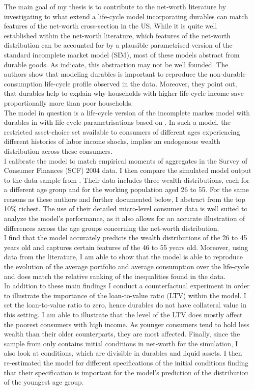 \documentclass[a4paper,12pt,legno]{article}
\begin{document}
The main goal of my thesis is to contribute to the net-worth literature by investigating to what extend a life-cycle model incorporating durables can match features of the net-worth cross-section in the US. While it is quite well established within the net-worth literature, which features of the net-worth distribution can be accounted for by a plausible parametrised version of the standard incomplete market model (SIM), most of these models abstract from durable goods. As \cite{FV&K2011}  indicate, this abstraction may not be well founded. The authors show that modeling durables is important to reproduce the non-durable consumption life-cycle profile observed in the data. Moreover, they point out, that durables help to explain why households with higher life-cycle income save proportionally more than poor households.\\
The model in question is a life-cycle version of the incomplete markes model with durables in \cite{hintermaier2010} with life-cycle parametrisations based on \cite{hintermaier2011}. In such a model, the restricted asset-choice set available to consumers of different ages experiencing different histories of labor income shocks, implies an endogenous wealth distribution across these consumers. \\
I calibrate the model to match empirical moments of aggregates in the Survey of Consumer Finances (SCF) 2004 data. I then compare the simulated model output to the data sample from \cite{hintermaier2011}. Their data includes three wealth distributions, each for a different age group and for the working population aged 26 to 55. For the same reasons as these authors and further documented below, I abstract from the top 10\% richest. The use of their detailed micro-level consumer data is well suited to analyze the model's performance, as it also allows for an accurate illustration of differences across the age groups concerning the net-worth distribution.\\
I find that the model accurately predicts the wealth distributions of the 26 to 45 years old and captures certain features of the 46 to 55 years old. Moreover, using data from the literature, I am able to show that the model is able to reproduce the evolution of the average portfolio and average consumption over the life-cycle and does match the relative ranking of the inequalities found in the data. 
\\ 
In addition to these main findings I conduct a counterfactual experiment in order to illustrate the importance of the loan-to-value ratio (LTV) within the model. I set the loan-to-value ratio to zero, hence durables do not have collateral value in this setting. I am able to illustrate that the level of the LTV does mostly affect the poorest consumers with high income. As younger consumers tend to hold less wealth than their older counterparts, they are most affected. Finally, since the sample from \cite{hintermaier2011} only contains initial conditions in net-worth for the simulation, I also look at conditions, which are divisible in durables and liquid assets. I then re-estimated the model for different specifications of the initial conditions finding that their specification is important for the model's prediction of the distribution of the youngest age group. 
\end{document}
